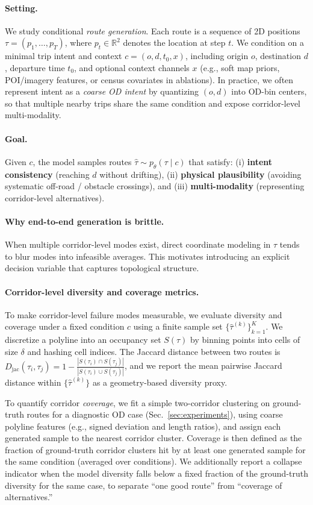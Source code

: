 \paragraph{Setting.}
We study conditional \emph{route generation}.
Each route is a sequence of 2D positions $\tau = (p_1,\dots,p_T)$, where $p_t \in \mathbb{R}^2$ denotes the location at step $t$.
We condition on a minimal trip intent and context
$c = (o, d, t_0, x)$,
including origin $o$, destination $d$, departure time $t_0$, and optional context channels $x$ (e.g., soft map priors, POI/imagery features, or census covariates in ablations).
In practice, we often represent intent as a \emph{coarse OD intent} by quantizing $(o,d)$ into OD-bin centers, so that multiple nearby trips share the same condition and expose corridor-level multi-modality.

\paragraph{Goal.}
Given $c$, the model samples routes $\hat{\tau} \sim p_\theta(\tau \mid c)$ that satisfy:
(i) \textbf{intent consistency} (reaching $d$ without drifting),
(ii) \textbf{physical plausibility} (avoiding systematic off-road / obstacle crossings),
and (iii) \textbf{multi-modality} (representing corridor-level alternatives).

\paragraph{Why end-to-end generation is brittle.}
When multiple corridor-level modes exist, direct coordinate modeling in $\tau$ tends to blur modes into infeasible averages.
This motivates introducing an explicit decision variable that captures topological structure.

\paragraph{Corridor-level diversity and coverage metrics.}
To make corridor-level failure modes measurable, we evaluate diversity and coverage under a fixed condition $c$ using a finite sample set $\{\hat{\tau}^{(k)}\}_{k=1}^K$.
We discretize a polyline into an occupancy set $S(\tau)$ by binning points into cells of size $\delta$ and hashing cell indices.
The Jaccard distance between two routes is
$D_{\mathrm{jac}}(\tau_i,\tau_j)=1-\frac{|S(\tau_i)\cap S(\tau_j)|}{|S(\tau_i)\cup S(\tau_j)|}$,
and we report the mean pairwise Jaccard distance within $\{\hat{\tau}^{(k)}\}$ as a geometry-based diversity proxy.

To quantify corridor \emph{coverage}, we fit a simple two-corridor clustering on ground-truth routes for a diagnostic OD case (Sec.~\ref{sec:experiments}), using coarse polyline features (e.g., signed deviation and length ratios), and assign each generated sample to the nearest corridor cluster.
Coverage is then defined as the fraction of ground-truth corridor clusters hit by at least one generated sample for the same condition (averaged over conditions).
We additionally report a collapse indicator when the model diversity falls below a fixed fraction of the ground-truth diversity for the same case, to separate ``one good route'' from ``coverage of alternatives.''
